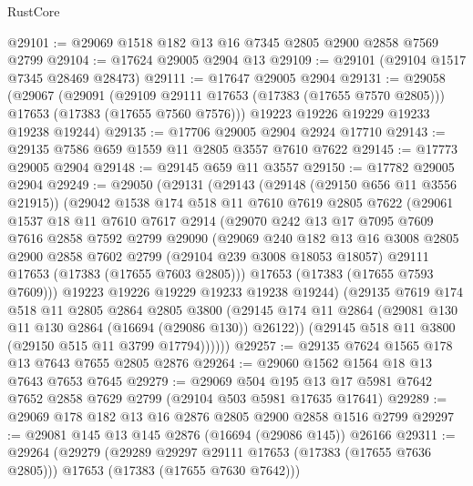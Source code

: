 \begin{lexlean}{RustCore}
\begin{coremodule}
@29101 := @29069 @1518 @182 @13 @16 @7345 @2805 @2900 @2858 @7569 @2799
@29104 := @17624 @29005 @2904 @13
@29109 := @29101 (@29104 @1517 @7345 @28469 @28473)
@29111 := @17647 @29005 @2904
@29131 := @29058
    (@29067
      (@29091
        (@29109 @29111 @17653 (@17383 (@17655 @7570 @2805)))
        @17653
        (@17383 (@17655 @7560 @7576)))
      @19223
      @19226
      @19229
      @19233
      @19238
      @19244)
@29135 := @17706 @29005 @2904 @2924 @17710
@29143 := @29135 @7586 @659 @1559 @11 @2805 @3557 @7610 @7622
@29145 := @17773 @29005 @2904
@29148 := @29145 @659 @11 @3557
@29150 := @17782 @29005 @2904
@29249 := @29050
    (@29131
      (@29143
        (@29148 (@29150 @656 @11 @3556 @21915))
        (@29042
          @1538
          @174
          @518
          @11
          @7610
          @7619
          @2805
          @7622
          (@29061
            @1537
            @18
            @11
            @7610
            @7617
            @2914
            (@29070
              @242
              @13
              @17
              @7095
              @7609
              @7616
              @2858
              @7592
              @2799
              @29090
              (@29069
                @240
                @182
                @13
                @16
                @3008
                @2805
                @2900
                @2858
                @7602
                @2799
                (@29104 @239 @3008 @18053 @18057)
                @29111
                @17653
                (@17383 (@17655 @7603 @2805)))
              @17653
              (@17383 (@17655 @7593 @7609)))
            @19223
            @19226
            @19229
            @19233
            @19238
            @19244)
          (@29135
            @7619
            @174
            @518
            @11
            @2805
            @2864
            @2805
            @3800
            (@29145 @174 @11 @2864 (@29081 @130 @11 @130 @2864 (@16694 (@29086 @130)) @26122))
            (@29145 @518 @11 @3800 (@29150 @515 @11 @3799 @17794))))))
@29257 := @29135 @7624 @1565 @178 @13 @7643 @7655 @2805 @2876
@29264 := @29060 @1562 @1564 @18 @13 @7643 @7653 @7645
@29279 := @29069
    @504
    @195
    @13
    @17
    @5981
    @7642
    @7652
    @2858
    @7629
    @2799
    (@29104 @503 @5981 @17635 @17641)
@29289 := @29069 @178 @182 @13 @16 @2876 @2805 @2900 @2858 @1516 @2799
@29297 := @29081 @145 @13 @145 @2876 (@16694 (@29086 @145)) @26166
@29311 := @29264
    (@29279
      (@29289 @29297 @29111 @17653 (@17383 (@17655 @7636 @2805)))
      @17653
      (@17383 (@17655 @7630 @7642)))

\end{coremodule}
\end{lexlean}
